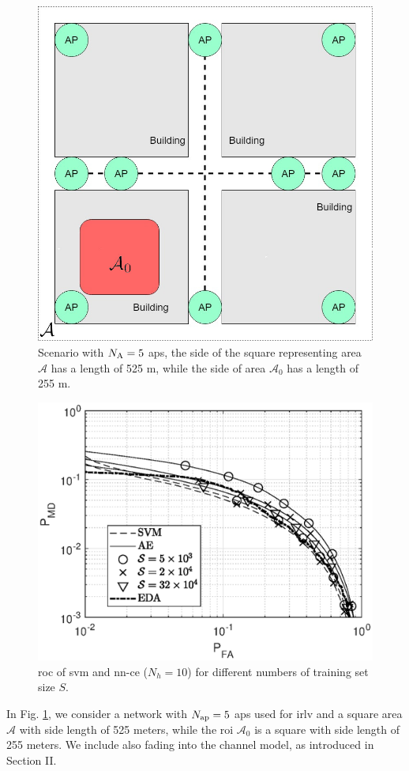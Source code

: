 \documentclass[draftcls,onecolumn,12pt]{IEEEtran}
\begin{document}
\begin{figure}[t]
    \centering
    \includegraphics[width=0.5\columnwidth]{scenarioBuilding.jpg}
    \caption{Scenario with $N_{\rm A} =5$ \acp{ap}, the side of the square representing area $\mathcal A$ has a length of 525 m, while the side of area $\mathcal A_0$ has a length of 255 m.} 
    \label{fig:mBS}
\end{figure}
\begin{figure}[t]
    \centering
    \includegraphics[width=0.6\columnwidth]{res_training_10BS_2Class.eps}
    \caption{\ac{roc} of \ac{svm} and \ac{nn}-\ac{ce} ($N_h = 10$) for different numbers of training set size $S$.}
    \label{fig:kf1}
\end{figure}

In Fig. \ref{fig:mBS}, we consider a network with $N_{\rm ap}=5$ \acp{ap} used for \ac{irlv} and a square area $\mathcal A$ with side length of 525 meters, while the \ac{roi} $\mathcal A_0$ is a square with side length of 255 meters. 
We include also fading into the channel model, as introduced in Section II.
\end{document}

